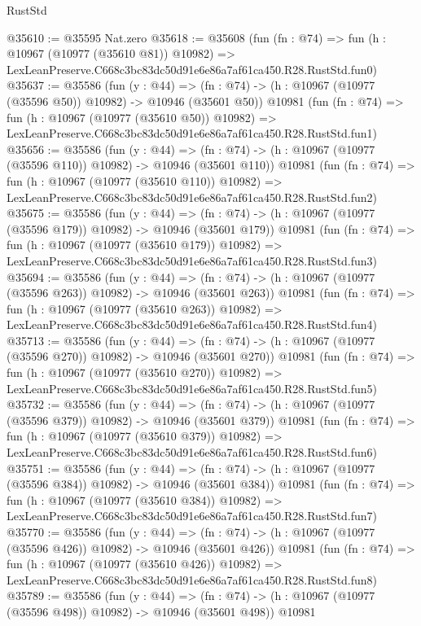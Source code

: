 \begin{lexlean}{RustStd}
\begin{coremodule}
@35610 := @35595 Nat.zero
@35618 := @35608
    (fun (fn : @74) =>
    fun (h : @10967 (@10977 (@35610 @81)) @10982) =>
    LexLeanPreserve.C668c3bc83dc50d91e6e86a7af61ca450.R28.RustStd.fun0)
@35637 := @35586
    (fun (y : @44) =>
    (fn : @74) -> (h : @10967 (@10977 (@35596 @50)) @10982) -> @10946 (@35601 @50))
    @10981
    (fun (fn : @74) =>
    fun (h : @10967 (@10977 (@35610 @50)) @10982) =>
    LexLeanPreserve.C668c3bc83dc50d91e6e86a7af61ca450.R28.RustStd.fun1)
@35656 := @35586
    (fun (y : @44) =>
    (fn : @74) -> (h : @10967 (@10977 (@35596 @110)) @10982) -> @10946 (@35601 @110))
    @10981
    (fun (fn : @74) =>
    fun (h : @10967 (@10977 (@35610 @110)) @10982) =>
    LexLeanPreserve.C668c3bc83dc50d91e6e86a7af61ca450.R28.RustStd.fun2)
@35675 := @35586
    (fun (y : @44) =>
    (fn : @74) -> (h : @10967 (@10977 (@35596 @179)) @10982) -> @10946 (@35601 @179))
    @10981
    (fun (fn : @74) =>
    fun (h : @10967 (@10977 (@35610 @179)) @10982) =>
    LexLeanPreserve.C668c3bc83dc50d91e6e86a7af61ca450.R28.RustStd.fun3)
@35694 := @35586
    (fun (y : @44) =>
    (fn : @74) -> (h : @10967 (@10977 (@35596 @263)) @10982) -> @10946 (@35601 @263))
    @10981
    (fun (fn : @74) =>
    fun (h : @10967 (@10977 (@35610 @263)) @10982) =>
    LexLeanPreserve.C668c3bc83dc50d91e6e86a7af61ca450.R28.RustStd.fun4)
@35713 := @35586
    (fun (y : @44) =>
    (fn : @74) -> (h : @10967 (@10977 (@35596 @270)) @10982) -> @10946 (@35601 @270))
    @10981
    (fun (fn : @74) =>
    fun (h : @10967 (@10977 (@35610 @270)) @10982) =>
    LexLeanPreserve.C668c3bc83dc50d91e6e86a7af61ca450.R28.RustStd.fun5)
@35732 := @35586
    (fun (y : @44) =>
    (fn : @74) -> (h : @10967 (@10977 (@35596 @379)) @10982) -> @10946 (@35601 @379))
    @10981
    (fun (fn : @74) =>
    fun (h : @10967 (@10977 (@35610 @379)) @10982) =>
    LexLeanPreserve.C668c3bc83dc50d91e6e86a7af61ca450.R28.RustStd.fun6)
@35751 := @35586
    (fun (y : @44) =>
    (fn : @74) -> (h : @10967 (@10977 (@35596 @384)) @10982) -> @10946 (@35601 @384))
    @10981
    (fun (fn : @74) =>
    fun (h : @10967 (@10977 (@35610 @384)) @10982) =>
    LexLeanPreserve.C668c3bc83dc50d91e6e86a7af61ca450.R28.RustStd.fun7)
@35770 := @35586
    (fun (y : @44) =>
    (fn : @74) -> (h : @10967 (@10977 (@35596 @426)) @10982) -> @10946 (@35601 @426))
    @10981
    (fun (fn : @74) =>
    fun (h : @10967 (@10977 (@35610 @426)) @10982) =>
    LexLeanPreserve.C668c3bc83dc50d91e6e86a7af61ca450.R28.RustStd.fun8)
@35789 := @35586
    (fun (y : @44) =>
    (fn : @74) -> (h : @10967 (@10977 (@35596 @498)) @10982) -> @10946 (@35601 @498))
    @10981

\end{coremodule}
\end{lexlean}
